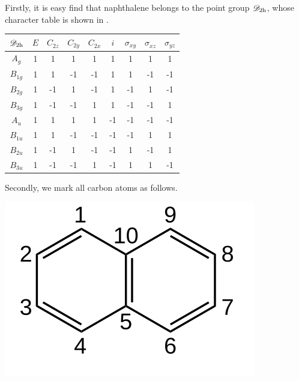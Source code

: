 Firstly, it is easy find that naphthalene belongs to the point group $\mathscr{D}_{\rm 2h}$, whose character table is shown in .		
		\begin{center}
		\setlength{\abovecaptionskip}{0em}
		\label{tab:chatab_5}
		\begin{tabular}{ccccccccc}\hline
	$\mathscr{D}_{\rm 2h}$ & $E$ & $C_{2z}$ &	$C_{2y}$	& $C_{2x}$	&	$i$	&	$\sigma_{xy}$	&	$\sigma_{xz}$ &	$\sigma_{yz}$\\ \hline
			$A_g$		&	1	&	1	&	1	&	1	&	1	&	1	&	1	&	1	\\
			$B_{1g}$	&	1	&	1	&	-1	&	-1	&	1	&	1	&	-1	&	-1	\\
			$B_{2g}$ 	&	1	&	-1	&	1	&	-1	&	1	&	-1	&	1	&	-1	\\
			$B_{3g}$ 	&	1	&	-1	&	-1	&	1	&	1	&	-1	&	-1	&	1	\\ 
			$A_u$		&	1	&	1	&	1	&	1	&	-1	&	-1	&	-1	&	-1	\\
			$B_{1u}$	&	1	&	1	&	-1	&	-1	&	-1	&	-1	&	1	&	1	\\
			$B_{2u}$ 	&	1	&	-1	&	1	&	-1	&	-1	&	1	&	-1	&	1	\\
			$B_{3u}$ 	&	1	&	-1	&	-1	&	1	&	-1	&	1	&	1	&	-1	\\ \hline
		\end{tabular}
		\end{center}
		
		Secondly, we mark all carbon atoms as follows.
		\begin{center}
		\includegraphics[scale=1.0]{./structures/exercise_1/naphthalene/0.png}
		\setlength{\abovecaptionskip}{-0.3em}
		\setlength{\belowcaptionskip}{-0.8em}
		\end{center}	
		
